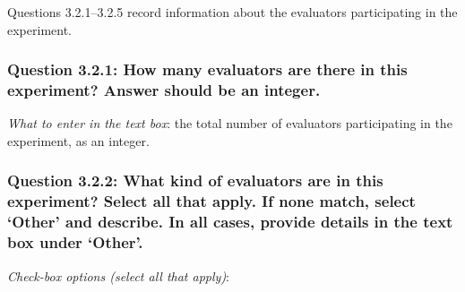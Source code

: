 \documentclass[11pt,a4paper]{article}
\begin{document}
Questions 3.2.1--3.2.5 record information about the evaluators participating in the experiment.

\vspace{-.3cm}
\subsubsection*{Question 3.2.1:  How many evaluators are there in this experiment? Answer should be an integer.}

\noindent\textit{What to enter in the text box}: the total number of evaluators participating in the experiment, as an integer.

\vspace{-.3cm}
\subsubsection*{Question 3.2.2:  What kind of evaluators are in this experiment? Select all that apply. If none match, select `Other' and describe. In all cases, provide details in the text box under `Other'.}

\noindent\textit{Check-box options (select all that apply)}:  
\vspace{-.1cm}
\end{document}

